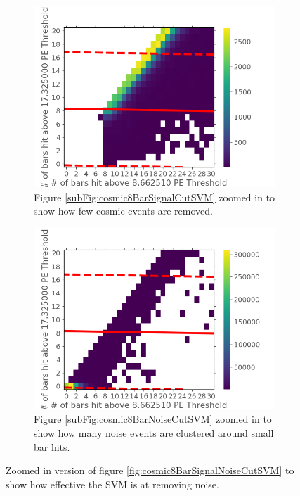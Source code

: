 \begin{figure}[!h]
\centering
\begin{subfigure}{.5\textwidth}
  \centering
  \includegraphics[width=\linewidth]{Chapter5/Figs/Raster/Cosmic8BarSignalZoomCutSVM.png}
  \captionsetup{width=.9\linewidth}
  \caption{Figure \ref{subFig:cosmic8BarSignalCutSVM} zoomed in to show how few cosmic events are removed.} 
  \label{subFig:cosmic8BarSignalZoomCutSVM}
\end{subfigure}%
\begin{subfigure}{.5\textwidth}
  \centering
\includegraphics[width=\linewidth]{Chapter5/Figs/Raster/Cosmic8BarNoiseZoomCutSVM.png}
  \captionsetup{width=.9\linewidth}
  \caption{Figure \ref{subFig:cosmic8BarNoiseCutSVM} zoomed in to show how many noise events are clustered around small bar hits.}
  \label{subFig:Cosmic8BarNoiseZoomCutSVM}
\end{subfigure}
\caption{Zoomed in version of figure \ref{fig:cosmic8BarSignalNoiseCutSVM} to show how effective the SVM is at removing noise.}
\label{fig:Cosmic8BarSignalNoiseZoomCutSVM}
\end{figure}

